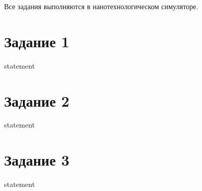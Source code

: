Все задания выполняются в нанотехнологическом симуляторе.

\section{Задание 1}

{statement}

\section{Задание 2}

{statement}

\section{Задание 3}

{statement}
